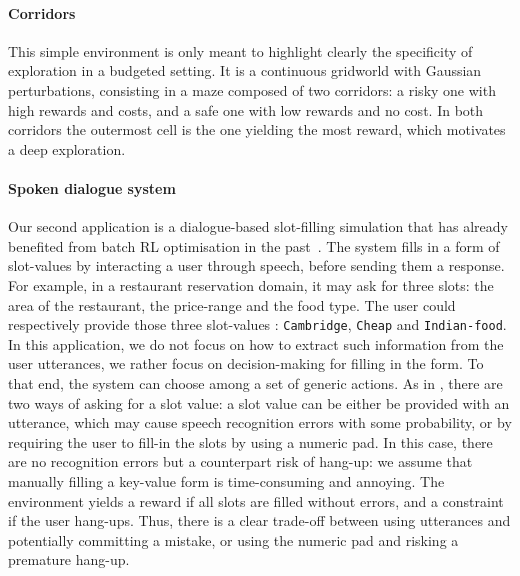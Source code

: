 \paragraph{Corridors}
This simple environment is only meant to highlight clearly the specificity of exploration in a budgeted setting. It is a continuous gridworld with Gaussian perturbations, consisting in a maze composed of two corridors: a risky one with high rewards and costs, and a safe one with low rewards and no cost. In both corridors the outermost cell is the one yielding the most reward, which motivates a deep exploration.

\paragraph{Spoken dialogue system}
Our second application is a dialogue-based slot-filling simulation that has already benefited from batch RL optimisation in the past~\citep{Li2009ReinforcementLF,chandramohan2010optimizing,pietquin2011sample}. The system fills in a form of slot-values by interacting a user through speech, before sending them a response. For example, in a restaurant reservation domain, it may ask for three slots: the area of the restaurant, the price-range and the food type. The user could respectively provide those three slot-values : \texttt{Cambridge}, \texttt{Cheap} and \texttt{Indian-food}. In this application, we do not focus on how to extract such information from the user utterances, we rather focus on decision-making for filling in the form. To that end, the system can choose among a set of generic actions. As in \citep{carrara2018safe}, there are two ways of asking for a slot value: a slot value can be either be provided with an utterance, which may cause speech recognition errors with some probability, or by requiring the user to fill-in the slots by using a numeric pad. In this case, there are no recognition errors but a counterpart risk of hang-up: we assume that manually filling a key-value form is time-consuming and annoying. The environment yields a reward if all slots are filled without errors, and a constraint if the user hang-ups. Thus, there is a clear trade-off between using utterances and potentially committing a mistake, or using the numeric pad and risking a premature hang-up.

